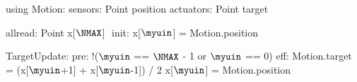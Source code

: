 using Motion:
  sensors: Point position
  actuators: Point target

allread: Point x[$\NMAX$] $\label{lineform-allread}$
init:
  x[$\myuin$] = Motion.position

TargetUpdate:
  pre: !($\myuin$ == $\NMAX$ - 1 or $\myuin$ == 0)
  eff:
       Motion.target = (x[$\myuin$+1] + x[$\myuin$-1]) / 2
       x[$\myuin$] = Motion.position